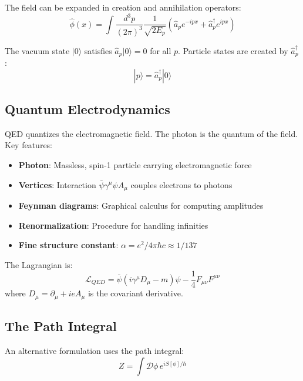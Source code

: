 \documentclass[12pt]{article}
\begin{document}
The field can be expanded in creation and annihilation operators:
\begin{equation}
    \hat{\phi}(x) = \int \frac{d^3 p}{(2\pi)^3} \frac{1}{\sqrt{2E_p}} \left( \hat{a}_p e^{-ipx} + \hat{a}_p^\dagger e^{ipx} \right)
\end{equation}

The vacuum state $|0\rangle$ satisfies $\hat{a}_p |0\rangle = 0$ for all $p$. Particle states are created by $\hat{a}_p^\dagger$:
\begin{equation}
    |p\rangle = \hat{a}_p^\dagger |0\rangle
\end{equation}

\subsection{Quantum Electrodynamics}

QED quantizes the electromagnetic field. The photon is the quantum of the field. Key features:

\begin{itemize}
    \item \textbf{Photon}: Massless, spin-1 particle carrying electromagnetic force
    \item \textbf{Vertices}: Interaction $\bar{\psi}\gamma^\mu \psi A_\mu$ couples electrons to photons
    \item \textbf{Feynman diagrams}: Graphical calculus for computing amplitudes
    \item \textbf{Renormalization}: Procedure for handling infinities
    \item \textbf{Fine structure constant}: $\alpha = e^2 / 4\pi\hbar c \approx 1/137$
\end{itemize}

The Lagrangian is:
\begin{equation}
    \mathcal{L}_{QED} = \bar{\psi}(i\gamma^\mu D_\mu - m)\psi - \frac{1}{4} F_{\mu\nu} F^{\mu\nu}
\end{equation}
where $D_\mu = \partial_\mu + ieA_\mu$ is the covariant derivative.

\subsection{The Path Integral}

An alternative formulation uses the path integral:
\begin{equation}
    Z = \int \mathcal{D}\phi \, e^{iS[\phi]/\hbar}
\end{equation}
\end{document}
